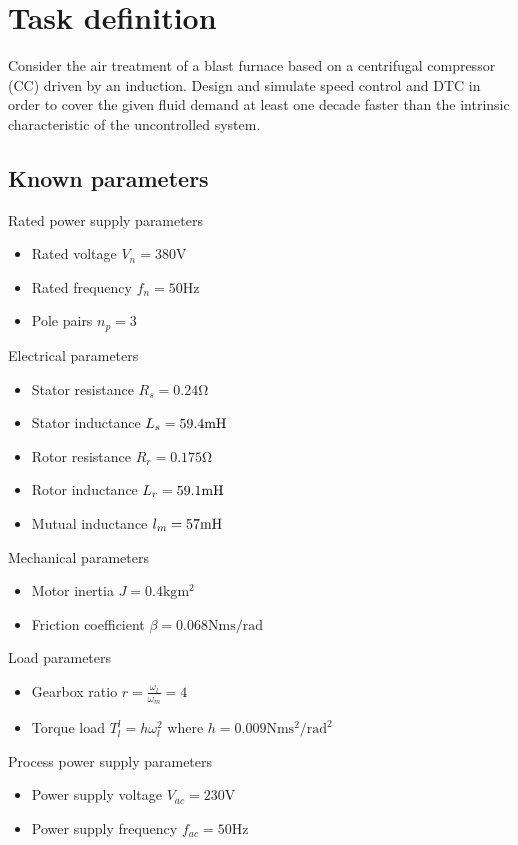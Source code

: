 \section{Task definition}

Consider the air treatment of a blast furnace based on a centrifugal compressor (CC) driven by an induction.
Design and simulate speed control and DTC in order to cover the given fluid demand at least one decade faster than the intrinsic characteristic of the uncontrolled system.

\subsection{Known parameters}

Rated power supply parameters
\begin{itemize}
	\item Rated voltage $V_n = 380 \unit{\V}$
	\item Rated frequency $f_n = 50 \unit{\Hz}$
	\item Pole pairs $n_p = 3$
\end{itemize}

Electrical parameters
\begin{itemize}
	\item Stator resistance $R_s = 0.24 \unit{\ohm}$
	\item Stator inductance $L_s = 59.4 \unit{\mH}$
	\item Rotor resistance $R_r = 0.175 \unit{\ohm}$
	\item Rotor inductance $L_r = 59.1 \unit{\mH}$
	\item Mutual inductance $l_m = 57 \unit{\mH}$
\end{itemize}

Mechanical parameters
\begin{itemize}
	\item Motor inertia $J = 0.4 \unit{\kg\square\m}$
	\item Friction coefficient $\beta = 0.068 \unit{\N\m\s\per\radian}$
\end{itemize}

Load parameters
\begin{itemize}
	\item Gearbox ratio $r = \frac{\omega_l}{\omega_m} = 4$
	\item Torque load $T^l_l = h \omega_l^2$ where $h = 0.009 \unit{\N\m\square\s\per\square\radian}$
\end{itemize}

Process power supply parameters
\begin{itemize}
	\item Power supply voltage $V_{ac} = 230 \unit{\V}$
	\item Power supply frequency $f_{ac} = 50 \unit{\Hz}$
\end{itemize}

